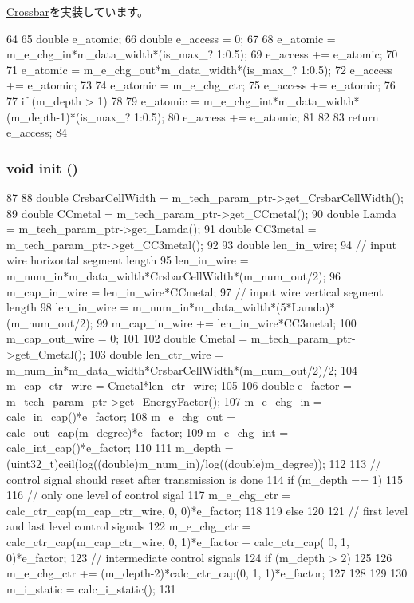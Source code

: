 \hyperlink{classCrossbar_ac2104354778bb800a8854b9386a66fbe}{Crossbar}を実装しています。


\begin{DoxyCode}
64 {
65     double e_atomic;
66     double e_access = 0;
67 
68     e_atomic = m_e_chg_in*m_data_width*(is_max_? 1:0.5);
69     e_access += e_atomic;
70 
71     e_atomic = m_e_chg_out*m_data_width*(is_max_? 1:0.5);
72     e_access += e_atomic;
73 
74     e_atomic = m_e_chg_ctr;
75     e_access += e_atomic;
76 
77     if (m_depth > 1)
78     {
79         e_atomic = m_e_chg_int*m_data_width*(m_depth-1)*(is_max_? 1:0.5);
80         e_access += e_atomic;
81     }
82 
83     return e_access;
84 }
\end{DoxyCode}
\hypertarget{classMultreeCrossbar_a02fd73d861ef2e4aabb38c0c9ff82947}{
\subsubsection[{init}]{\setlength{\rightskip}{0pt plus 5cm}void init ()}}
\label{classMultreeCrossbar_a02fd73d861ef2e4aabb38c0c9ff82947}



\begin{DoxyCode}
87 {
88     double CrsbarCellWidth = m_tech_param_ptr->get_CrsbarCellWidth();
89     double CCmetal = m_tech_param_ptr->get_CCmetal();
90     double Lamda = m_tech_param_ptr->get_Lamda();
91     double CC3metal = m_tech_param_ptr->get_CC3metal();
92 
93     double len_in_wire;
94     // input wire horizontal segment length
95     len_in_wire = m_num_in*m_data_width*CrsbarCellWidth*(m_num_out/2);
96     m_cap_in_wire = len_in_wire*CCmetal;
97     // input wire vertical segment length
98     len_in_wire = m_num_in*m_data_width*(5*Lamda)*(m_num_out/2);
99     m_cap_in_wire += len_in_wire*CC3metal;
100     m_cap_out_wire = 0;
101 
102     double Cmetal = m_tech_param_ptr->get_Cmetal();
103     double len_ctr_wire = m_num_in*m_data_width*CrsbarCellWidth*(m_num_out/2)/2;
104     m_cap_ctr_wire = Cmetal*len_ctr_wire;
105 
106     double e_factor = m_tech_param_ptr->get_EnergyFactor();
107     m_e_chg_in = calc_in_cap()*e_factor;
108     m_e_chg_out = calc_out_cap(m_degree)*e_factor;
109     m_e_chg_int = calc_int_cap()*e_factor;
110 
111     m_depth = (uint32_t)ceil(log((double)m_num_in)/log((double)m_degree));
112 
113     // control signal should reset after transmission is done
114     if (m_depth == 1)
115     {
116         // only one level of control sigal
117         m_e_chg_ctr = calc_ctr_cap(m_cap_ctr_wire, 0, 0)*e_factor;
118     }
119     else
120     {
121         // first level and last level control signals
122         m_e_chg_ctr = calc_ctr_cap(m_cap_ctr_wire, 0, 1)*e_factor + calc_ctr_cap(
      0, 1, 0)*e_factor;
123         // intermediate control signals
124         if (m_depth > 2)
125         {
126             m_e_chg_ctr += (m_depth-2)*calc_ctr_cap(0, 1, 1)*e_factor;
127         }
128     }
129 
130     m_i_static = calc_i_static();
131 }
\end{DoxyCode}


